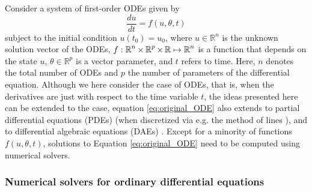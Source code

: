 Consider a system of first-order ODEs given by
\begin{equation}
 \frac{du}{dt} = f(u, \theta, t)
 \label{eq:original_ODE}
\end{equation}
subject to the initial condition $u(t_0) = u_0$, where $u \in \mathbb{R}^n$ is the unknown solution vector of the ODEs, $f: \operatorname{\mathbb{R}}^n \times \operatorname{\mathbb{R}}^p \times \operatorname{\mathbb{R}} \mapsto \operatorname{\mathbb{R}}^n$ is a function that depends on the state $u$, $\theta \in \mathbb R^p$ is a vector parameter, and $t$ refers to time.
Here, $n$ denotes the total number of ODEs and $p$ the number of parameters of the differential equation.
Although we here consider the case of ODEs, that is, when the derivatives are just with respect to the time variable $t$, the ideas presented here can be extended to the case, equation \eqref{eq:original_ODE} also extends to partial differential equations (PDEs) (when discretized via e.g. the method of lines \cite{ascher2008numerical}), and to differential algebraic equations (DAEs) \cite{hairer-solving-2}.
Except for a minority of functions $f(u,\theta, t)$, solutions to Equation \eqref{eq:original_ODE} need to be computed using numerical solvers. 

\subsubsection{Numerical solvers for ordinary differential equations}
\label{section:intro-numerical-solvers}

